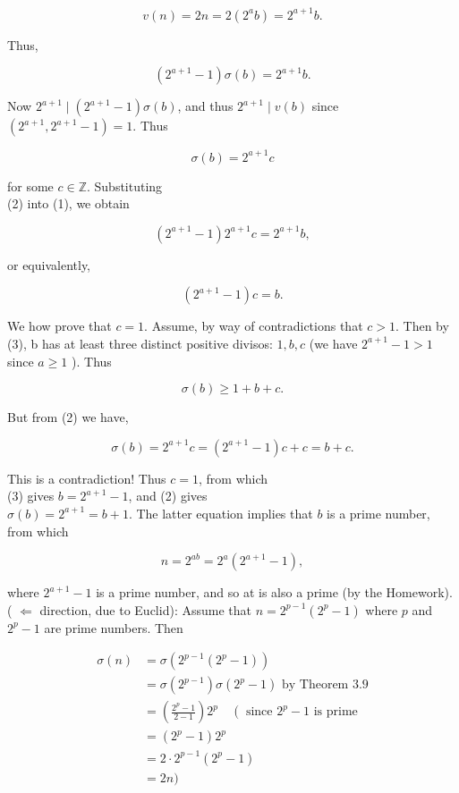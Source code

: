 \documentclass[10pt]{article}
\begin{document}
$$
v(n)=2 n=2\left(2^{a} b\right)=2^{a+1} b .
$$

Thus,


\begin{equation*}
\left(2^{a+1}-1\right) \sigma(b)=2^{a+1} b . \tag{1}
\end{equation*}


Now $2^{a+1} \mid\left(2^{a+1}-1\right) \sigma(b)$, and thus $2^{a+1} \mid v(b)$ since $\left(2^{a+1}, 2^{a+1}-1\right)=1$. Thus


\begin{equation*}
\sigma(b)=2^{a+1} c \tag{2}
\end{equation*}


for some $c \in \mathbb{Z}$. Substituting\\
(2) into (1), we obtain

$$
\left(2^{a+1}-1\right) 2^{a+1} c=2^{a+1} b,
$$

or equivalently,


\begin{equation*}
\left(2^{a+1}-1\right) c=b . \tag{3}
\end{equation*}


We how prove that $c=1$. Assume, by way of contradictions that $c>1$. Then by (3), b has at least three distinct positive divisos: $1, b, c$ (we have $2^{a+1}-1>1$ since $a \geqslant 1$ ). Thus

$$
\sigma(b) \geqslant 1+b+c .
$$

But from (2) we have,

$$
\sigma(b)=2^{a+1} c=\left(2^{a+1}-1\right) c+c=b+c .
$$

This is a contradiction! Thus $c=1$, from which\\
(3) gives $b=2^{a+1}-1$, and (2) gives\\
$\sigma(b)=2^{a+1}=b+1$. The latter equation implies that $b$ is a prime number, from which

$$
n=2^{a b}=2^{a}\left(2^{a+1}-1\right),
$$

where $2^{a+1}-1$ is a prime number, and so at is also a prime (by the Homework).\\
( $\Leftarrow$ direction, due to Euclid): Assume that $n=2^{p-1}\left(2^{p}-1\right)$ where $p$ and $2^{p}-1$ are prime numbers. Then

$$
\begin{aligned}
\sigma(n) & =\sigma\left(2^{p-1}\left(2^{p}-1\right)\right) \\
& =\sigma\left(2^{p-1}\right) \sigma\left(2^{p}-1\right) \text { by Theorem } 3.9 \\
& =\left(\frac{2^{p}-1}{2-1}\right) 2^{p} \quad\left(\text { since } 2^{p}-1\right. \text { is prime } \\
& =\left(2^{p}-1\right) 2^{p} \\
& =2 \cdot 2^{p-1}\left(2^{p}-1\right) \\
& =2 n)
\end{aligned}
$$
\end{document}
